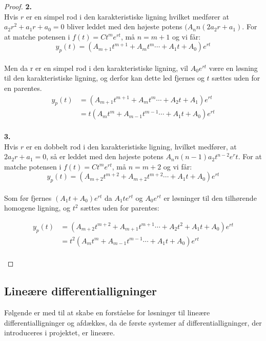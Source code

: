 \begin{proof}
\textbf{2.} \\
Hvis $r$ er en simpel rod i den karakteristiske ligning hvilket medfører at $a_2r^2+a_1r+a_0=0$ bliver leddet med den højeste potens $(A_nn(2a_2r+a_1)$. For at matche potensen i $f(t)=Ct^me^{rt}$, må $n=m+1$ og vi får: \\
\begin{equation*}
y_p(t)= (A_{m+1}t^{m+1}+A_{m}t^{m}  \cdots +A_1t+A_0)e^{rt}
\end{equation*} \\
Men da r  er en simpel rod i den karakteristiske ligning, vil $A_0e^{rt}$ være  en løsning til den karakteristiske ligning, og derfor kan dette led fjernes og $t$ sættes uden for en parentes. \\
\begin{align*}
y_p(t)&= (A_{m+1}t^{m+1}+A_{m}t^{m}  \cdots+ A_2t +A_1)e^{rt} \\
      &= t(A_{m}t^{m}+A_{m-1}t^{m-1}  \cdots +A_1t+A_0)e^{rt}
\end{align*} \\

\textbf{3.}\\
Hvis $r$ er en dobbelt rod i den karakteristiske ligning, hvilket medfører, at $2a_2r+a_1=0$, så er leddet med den højeste potens $A_nn(n-1)a_2t^{n-2}e^rt$. For at matche potensen i $f(t)=Ct^me^{rt}$, må $n=m+2$ og vi får: \\

\begin{equation*}
y_p(t)= (A_{m+2}t^{m+2}+A_{m+2}t^{m+2}  \cdots +A_1t+A_0)e^{rt}
\end{equation*} \\
Som før fjernes $(A_1t+A_0)e^{rt}$ da $A_1te^{rt}$ og $A_0e^{rt}$ er løsninger til den tilhørende homogene ligning, og $t^2$ sættes uden for parentes: 

\begin{align*}
y_p(t)&= (A_{m+2}t^{m+2}+A_{m+1}t^{m+1}  \cdots+ A_2t^2+A_1t+A_0)e^{rt} \\
      &= t^2(A_{m}t^{m}+A_{m-1}t^{m-1}  \cdots +A_1t+A_0)e^{rt}
\end{align*} \\

\end{proof}

\subsection{Lineære differentialligninger}
Følgende er med til at skabe en forståelse for løsninger til lineære differentialligninger og afdækkes, da de første systemer af differentialligninger, der introduceres i projektet, er lineære.
\hfill \break

